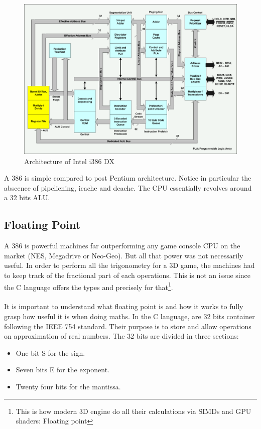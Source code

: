 \documentclass[book.tex]{subfiles}
\begin{document}
\begin{figure}[H]
\centering
  
      \includegraphics[width=\textwidth]{imgs/hardware/80386DX_arch.png}
\caption{Architecture of Intel i386 DX}
\end{figure}
A 386 is simple compared to post Pentium architecture. Notice in particular the abscence of pipeliening, icache and dcache. The CPU essentially revolves around a 32 bits ALU.








  \subsection{Floating Point}
  
   A 386 is powerful machines far outperforming any game console CPU on the market (NES, Megadrive or Neo-Geo). But all that power was not necessarily useful. In order to perform all the trigonometry for a 3D game, the machines had to keep track of the fractional part of each operations. This is not an issue since the C language offers the types  and  precisely for that\footnote{This is how modern 3D engine do all their calculations via SIMDs and GPU shaders: Floating point}.\\
\\
It is important to understand what floating point is and how it works to fully grasp how useful it is when doing maths. In the C language,  are 32 bits container following the IEEE 754 standard. Their purpose is to store and allow operations on approximation of real numbers. The 32 bits are divided in three sections:\\
\begin{itemize}
  \item One bit S for the sign.
  \item Seven bits E for the exponent.
  \item Twenty four bits for the mantissa.
\end{itemize} 
\end{document}
